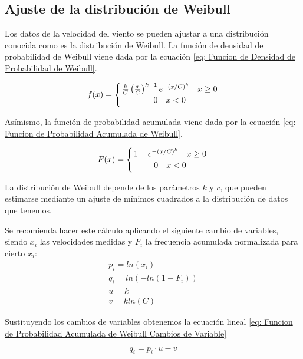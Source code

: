 \documentclass{IEEEtran}
\begin{document}
\subsection{Ajuste de la distribución de Weibull}

Los datos de la velocidad del viento se pueden ajustar a una distribución conocida como es la distribución de Weibull. La función de densidad de probabilidad de Weibull viene dada por la ecuación \ref{eq: Funcion de Densidad de Probabilidad de Weibull}.

\begin{equation}
    f(x) = \left\{ \frac{k}{C} \left( \frac{x}{C} \right)^{k - 1} e^{-(x/C)^k} \quad x \geq 0 \atop 0 \quad x < 0 \right.
    \label{eq: Funcion de Densidad de Probabilidad de Weibull}
\end{equation}

Asímismo, la función de probabilidad acumulada viene dada por la ecuación \ref{eq: Funcion de Probabilidad Acumulada de Weibull}.

\begin{equation}
    F(x) = \left\{ 1 - e^{-(x/C)^k} \quad x \geq 0 \atop 0 \quad x < 0 \right.
    \label{eq: Funcion de Probabilidad Acumulada de Weibull}
\end{equation}

La distribución de Weibull depende de los parámetros $k$ y $c$, que pueden estimarse mediante un ajuste de mínimos cuadrados a la distribución de datos que tenemos.

Se recomienda hacer este cálculo aplicando el siguiente cambio de variables, siendo $x_i$ las velocidades medidas y $F_i$ la frecuencia acumulada normalizada para cierto $x_i$:
\begin{gather*}
    p_i = ln(x_i) \\
    q_i = ln(- ln(1 - F_i)) \\
    u = k \\
    v = k ln(C)
\end{gather*}

Sustituyendo los cambios de variables obtenemos la ecuación lineal \ref{eq: Funcion de Probabilidad Acumulada de Weibull Cambios de Variable}

\begin{equation}
    q_i = p_i \cdot u - v
    \label{eq: Funcion de Probabilidad Acumulada de Weibull Cambios de Variable}
\end{equation}
\end{document}
